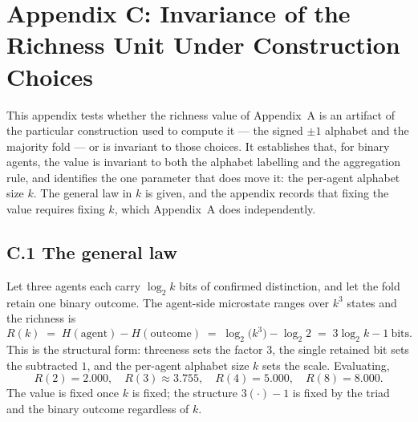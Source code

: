 \documentclass[11pt,oneside]{report}
\theoremstyle{definition}
\theoremstyle{remark}
\begin{document}
\section*{Appendix C: Invariance of the Richness Unit Under Construction Choices}

This appendix tests whether the richness value of Appendix~A is an artifact of the particular
construction used to compute it --- the signed \ensuremath{\pm 1} alphabet and the majority fold ---
or is invariant to those choices. It establishes that, for binary agents, the value is invariant to
both the alphabet labelling and the aggregation rule, and identifies the one parameter that does move
it: the per-agent alphabet size \ensuremath{k}. The general law in \ensuremath{k} is given, and the
appendix records that fixing the value requires fixing \ensuremath{k}, which Appendix~A does
independently.

\subsection*{C.1 The general law}
Let three agents each carry \ensuremath{\log_2 k} bits of confirmed distinction, and let the fold
retain one binary outcome. The agent-side microstate ranges over \ensuremath{k^{3}} states and the
richness is
\[
  R(k) \;=\; H(\text{agent}) - H(\text{outcome})
       \;=\; \log_2\!\big(k^{3}\big) - \log_2 2
       \;=\; 3\log_2 k - 1 \ \text{bits.}
\]
This is the structural form: threeness sets the factor \ensuremath{3}, the single retained bit sets
the subtracted \ensuremath{1}, and the per-agent alphabet size \ensuremath{k} sets the scale.
Evaluating,
\[
  R(2) = 2.000, \quad R(3) \approx 3.755, \quad R(4) = 5.000, \quad R(8) = 8.000.
\]
The value is fixed once \ensuremath{k} is fixed; the structure \ensuremath{3(\cdot) - 1} is fixed by
the triad and the binary outcome regardless of \ensuremath{k}.
\end{document}
